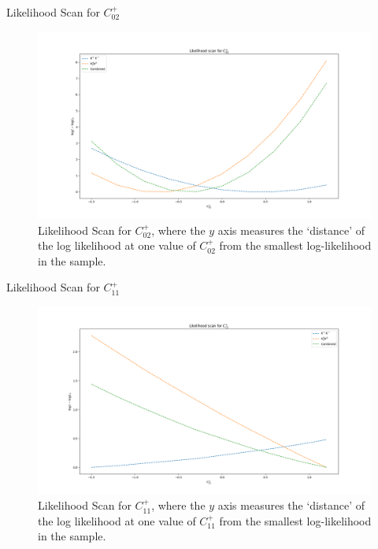 \begin{frame}{Likelihood Scan for $C_{02}^{+}$}
\begin{figure}
    \centering
        \includegraphics[width=\textwidth]{2020_04_23/figs/P02_Norm.png}
    \caption{Likelihood Scan for $C_{02}^{+}$, where the $y$ axis measures the `distance' of the log likelihood at one value of $C_{02}^{+}$ from the smallest log-likelihood in the sample.}
    \label{fig:scanCP02}
\end{figure}
\end{frame}

\begin{frame}{Likelihood Scan for $C_{11}^{+}$}
\begin{figure}
    \centering
        \includegraphics[width=\textwidth]{2020_04_23/figs/P11_Norm.png}
    \caption{Likelihood Scan for $C_{11}^{+}$, where the $y$ axis measures the `distance' of the log likelihood at one value of $C_{11}^{+}$ from the smallest log-likelihood in the sample.}
    \label{fig:scanCP11}
\end{figure}
\end{frame}


